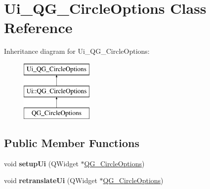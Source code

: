 \hypertarget{classUi__QG__CircleOptions}{\section{Ui\-\_\-\-Q\-G\-\_\-\-Circle\-Options Class Reference}
\label{classUi__QG__CircleOptions}
}
Inheritance diagram for Ui\-\_\-\-Q\-G\-\_\-\-Circle\-Options\-:\begin{figure}[H]
\begin{center}
\leavevmode
\includegraphics[height=3.000000cm]{classUi__QG__CircleOptions}
\end{center}
\end{figure}
\subsection*{Public Member Functions}
\begin{DoxyCompactItemize}
\item 
\hypertarget{classUi__QG__CircleOptions_a2056fb075d439ecb4919ce23993cce67}{void {\bfseries setup\-Ui} (Q\-Widget $\ast$\hyperlink{classQG__CircleOptions}{Q\-G\-\_\-\-Circle\-Options})}\label{classUi__QG__CircleOptions_a2056fb075d439ecb4919ce23993cce67}

\item 
\hypertarget{classUi__QG__CircleOptions_a06af276900d29dbcd2e267565e755d49}{void {\bfseries retranslate\-Ui} (Q\-Widget $\ast$\hyperlink{classQG__CircleOptions}{Q\-G\-\_\-\-Circle\-Options})}\label{classUi__QG__CircleOptions_a06af276900d29dbcd2e267565e755d49}

\end{DoxyCompactItemize}
